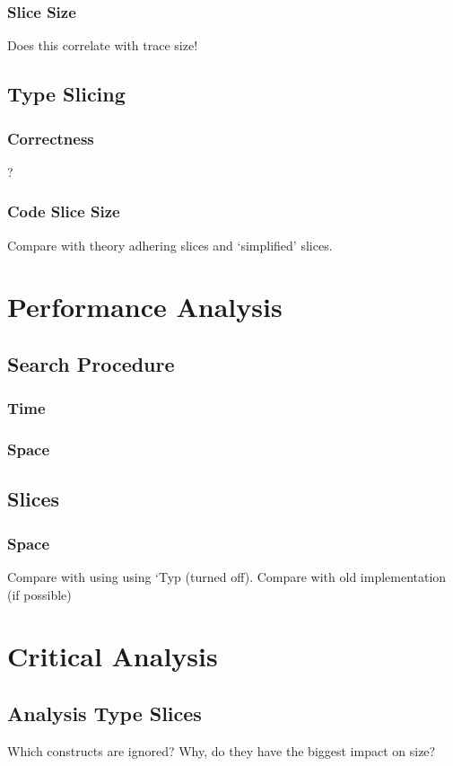 \subsubsection{Slice Size}
Does this correlate with trace size!

\subsection{Type Slicing}
\subsubsection{Correctness}
?
\subsubsection{Code Slice Size}
Compare with theory adhering slices and `simplified' slices.


\section{Performance Analysis}\label{sec:PerformanceAnalysis}
\subsection{Search Procedure}
\subsubsection{Time}
\subsubsection{Space}

\subsection{Slices}
\subsubsection{Space}
Compare with using using `Typ (turned off). Compare with old implementation (if possible)

\section{Critical Analysis}\label{sec:CriticalAnalysis}
\subsection{Analysis Type Slices}
Which constructs are ignored? Why, do they have the biggest impact on size?
